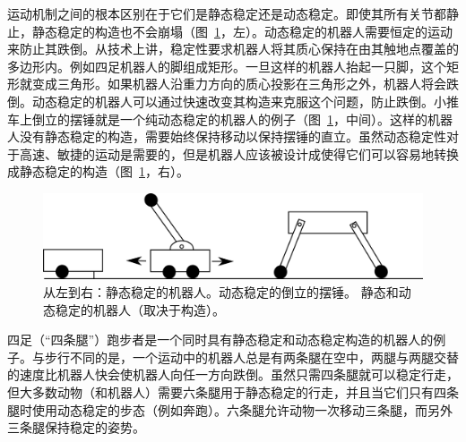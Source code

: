 运动机制之间的根本区别在于它们是静态稳定还是动态稳定。即使其所有关节都静止，静态稳定的构造也不会崩塌（图~\ref{fig:stability}，左）。动态稳定的机器人需要恒定的运动来防止其跌倒。从技术上讲，稳定性要求机器人将其质心保持在由其触地点覆盖的多边形内。例如四足机器人的脚组成矩形。一旦这样的机器人抬起一只脚，这个矩形就变成三角形。如果机器人沿重力方向的质心投影在三角形之外，机器人将会跌倒。动态稳定的机器人可以通过快速改变其构造来克服这个问题，防止跌倒。小推车上倒立的摆锤就是一个纯动态稳定的机器人的例子（图~\ref{fig:stability}，中间）。这样的机器人没有静态稳定的构造，需要始终保持移动以保持摆锤的直立。虽然动态稳定性对于高速、敏捷的运动是需要的，但是机器人应该被设计成使得它们可以容易地转换成静态稳定的构造（图~\ref{fig:stability}，右）。

\begin{figure}
	\centering
		\includegraphics[width=\textwidth]{figs/stability.png}
	\caption{从左到右：静态稳定的机器人。动态稳定的倒立的摆锤。 静态和动态稳定的机器人（取决于构造）。}
	\label{fig:stability}
\end{figure}


四足（“四条腿”）跑步者是一个同时具有静态稳定和动态稳定构造的机器人的例子。与步行不同的是，一个运动中的机器人总是有两条腿在空中，两腿与两腿交替的速度比机器人快会使机器人向任一方向跌倒。虽然只需四条腿就可以稳定行走，但大多数动物（和机器人）需要六条腿用于静态稳定的行走，并且当它们只有四条腿时使用动态稳定的步态（例如奔跑）。六条腿允许动物一次移动三条腿，而另外三条腿保持稳定的姿势。

